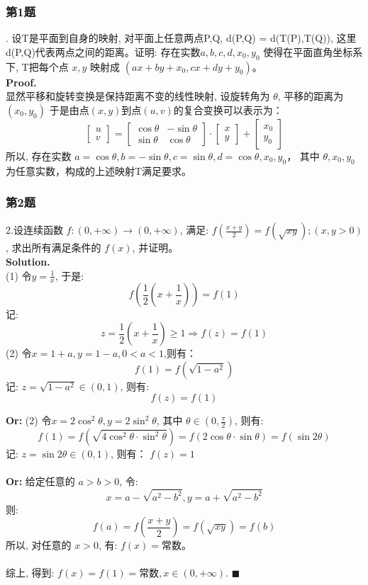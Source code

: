 \documentclass[UTF8]{article}
\begin{document}
\subsubsection{第1题}
. 设T是平面到自身的映射, 对平面上任意两点P,Q, d(P,Q) = d(T(P),T(Q)), 这里d(P,Q)代表两点之间的距离。证明: 存在实数$a,b,c,d,x_0,y_0$ 使得在平面直角坐标系下, T把每个点 $x,y$ 映射成 $(ax+by+x_0, cx+dy+y_0)$。\\
\textbf{Proof.} \\
显然平移和旋转变换是保持距离不变的线性映射, 设旋转角为 $\theta$, 平移的距离为$(x_0,y_0)$ 于是由点$(x,y)$到点$(u,v)$的复合变换可以表示为： \\
$$
\begin{bmatrix}
u \\
v
\end{bmatrix} =
\begin{bmatrix}
\cos \theta & -\sin \theta \\
\sin \theta & \cos \theta 
\end{bmatrix} \cdot 
\begin{bmatrix}
x \\
y
\end{bmatrix} + 
\begin{bmatrix}
x_0 \\
y_0
\end{bmatrix}
$$
所以, 存在实数 $a=\cos \theta, b=-\sin \theta, c=\sin \theta, d=\cos \theta, x_0,y_0$， 其中 $\theta, x_0,y_0$ 为任意实数，构成的上述映射T满足要求。

\subsubsection{第2题}
\noindent 2.设连续函数 $f: (0,+\infty) \longrightarrow (0,+\infty)$, 满足: $f(\frac{x+y}{2}) = f(\sqrt{xy}); (x,y>0)$ , 求出所有满足条件的 $f(x)$, 并证明。\\
\textbf{Solution.} \\
(1) 令$y=\frac{1}{x}$, 于是:
$$f\left (\frac{1}{2}(x+\frac{1}{x})\right) = f(1)$$
记: 
$$z=\frac{1}{2}(x+\frac{1}{x}) \ge 1 \Longrightarrow f(z) = f(1) $$
(2) 令$x=1+a,y=1-a , 0<a<1$,则有：
$$f(1) = f(\sqrt{1-a^2})$$
记:  $z=\sqrt{1-a^2} \in (0,1)$, 则有:
$$f(z) = f(1)$$

\noindent \textbf{Or: }(2) 令$x=2\cos^2\theta, y=2\sin^2\theta$, 其中 $\theta \in (0,\frac{\pi}{2})$, 则有:
$$f(1) = f(\sqrt{4\cos^2\theta \cdot \sin^2\theta}) = f(2\cos\theta \cdot \sin \theta) = f(\sin 2\theta)$$
记: $z=\sin2\theta \in (0,1)$, 则有： $f(z) =1$
\\
\\
\noindent \textbf{Or:} 给定任意的 $a>b>0$, 令:
$$ x = a - \sqrt{a^2-b^2}, y = a + \sqrt{a^2-b^2}$$
则:
$$ f(a) = f(\frac{x+y}{2}) = f(\sqrt{xy}) = f(b) $$
所以, 对任意的 $x>0$, 有: $f(x) = $常数。
\\
\\
综上, 得到: $f(x)=f(1) = \text{常数}, x\in (0,+\infty).$ $\blacksquare$
\end{document}
